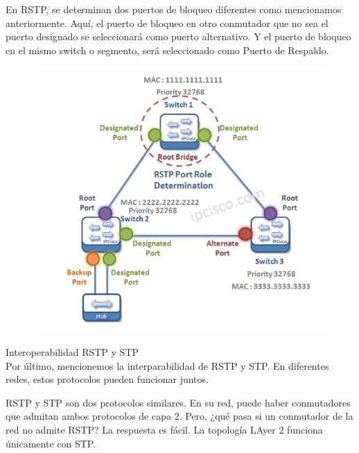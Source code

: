En RSTP, se determinan dos puertos de bloqueo diferentes como mencionamos anteriormente. Aquí, el puerto de bloqueo en otro conmutador que no sea el puerto designado se seleccionará como puerto alternativo. Y el puerto de bloqueo en el mismo switch o segmento, será seleccionado como Puerto de Respaldo.
\begin{figure}[ph!]
	\centering
	\includegraphics[width=0.7\linewidth]{screenshot003}
	\caption{}
	\label{fig:screenshot003}
\end{figure}


Interoperabilidad RSTP y STP
\\
Por último, mencionemos la interparabilidad de RSTP y STP. En diferentes redes, estos protocolos pueden funcionar juntos.

RSTP y STP son dos protocolos similares. En su red, puede haber conmutadores que admitan ambos protocolos de capa 2. Pero, ¿qué pasa si un conmutador de la red no admite RSTP? La respuesta es fácil. La topología LAyer 2 funciona únicamente con STP.
